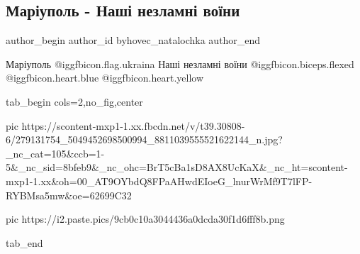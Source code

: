 
 
 
 
 
 
\subsection{Маріуполь - Наші незламні воїни}
\label{sec:22_04_2022.fb.byhovec_natalochka.1.mariupol}
 
\ifcmt
 author_begin
   author_id byhovec_natalochka
 author_end
\fi

Маріуполь @igg{fbicon.flag.ukraina}
Наші незламні воїни @igg{fbicon.biceps.flexed}  @igg{fbicon.heart.blue}  @igg{fbicon.heart.yellow} 

\ifcmt
  tab_begin cols=2,no_fig,center

     pic https://scontent-mxp1-1.xx.fbcdn.net/v/t39.30808-6/279131754_5049452698500994_8811039555521622144_n.jpg?_nc_cat=105&ccb=1-5&_nc_sid=8bfeb9&_nc_ohc=BrT5cBa1sD8AX8UcKaX&_nc_ht=scontent-mxp1-1.xx&oh=00_AT9OYbdQ8FPaAHwdEIoeG_lnurWrMf9T7lFP-RYBMsa5mw&oe=62699C32

		 pic https://i2.paste.pics/9cb0c10a3044436a0dcda30f1d6fff8b.png

  tab_end
\fi
